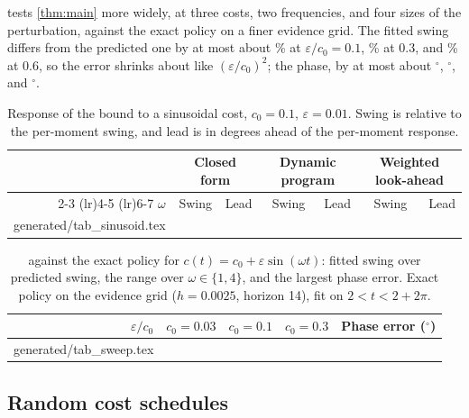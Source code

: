 \documentclass[11pt]{article}
\makeatletter
\newcommand\inputrows[1]{\@@input #1 }
\theoremstyle{definition}
\theoremstyle{remark}
\makeatother
\begin{document}
 tests \cref{thm:main} more widely, at three costs, two frequencies, and four sizes
of the perturbation, against the exact policy on a finer evidence grid. The fitted swing differs
from the predicted one by at most about \SweepSwingTenth\% at $\varepsilon/c_0 = 0.1$, \SweepSwingThird\% at 0.3, and
\SweepSwingSixTenths\% at 0.6, so the error shrinks about like $(\varepsilon/c_0)^2$; the phase, by
at most about \SweepPhaseTenth$^\circ$, \SweepPhaseThird$^\circ$, and \SweepPhaseSixTenths$^\circ$.


\begin{table}[t]
  \centering
  \caption{Response of the bound to a sinusoidal cost, $c_0 = 0.1$, $\varepsilon = 0.01$. Swing is
    relative to the per-moment swing, and lead is in degrees ahead of the per-moment response.}
  \label{tab:sinusoid}
  \begin{tabular}{rrrrrrr}
    \toprule
    & \multicolumn{2}{c}{Closed form} & \multicolumn{2}{c}{Dynamic program} & \multicolumn{2}{c}{Weighted look-ahead} \\
    \cmidrule(lr){2-3} \cmidrule(lr){4-5} \cmidrule(lr){6-7}
    $\omega$ & Swing & Lead & Swing & Lead & Swing & Lead \\
    \midrule
    \inputrows{generated/tab_sinusoid.tex}
    \bottomrule
  \end{tabular}
\end{table}

\begin{table}[t]
  \centering
  \caption{ against the exact policy for $c(t) = c_0 + \varepsilon \sin(\omega t)$:
    fitted swing over predicted swing, the range over $\omega \in \{1, 4\}$, and the largest
    phase error. Exact policy on the evidence grid ($h = 0.0025$, horizon 14), fit on
    $2 < t < 2 + 2\pi$.}
  \label{tab:sweep}
  \begin{tabular}{rrrrr}
    \toprule
    $\varepsilon/c_0$ & $c_0 = 0.03$ & $c_0 = 0.1$ & $c_0 = 0.3$ & Phase error ($^\circ$) \\
    \midrule
    \inputrows{generated/tab_sweep.tex}
    \bottomrule
  \end{tabular}
\end{table}

\subsection{Random cost schedules}
\label{sec:random}
\end{document}
